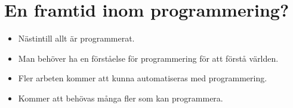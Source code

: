 

\section[Framtid inom det?]{En framtid inom programmering?}

\begin{frame}
  \begin{example}[Förståelse]
    \begin{itemize}
      \item Nästintill allt är programmerat.
      \item Man behöver ha en förståelse för programmering för att förstå 
        världen.
    \end{itemize}
  \end{example}

  \begin{example}[Arbete]
    \begin{itemize}
      \item Fler arbeten kommer att kunna automatiseras med programmering.
      \item Kommer att behövas många fler som kan programmera.
    \end{itemize}
  \end{example}
\end{frame}

